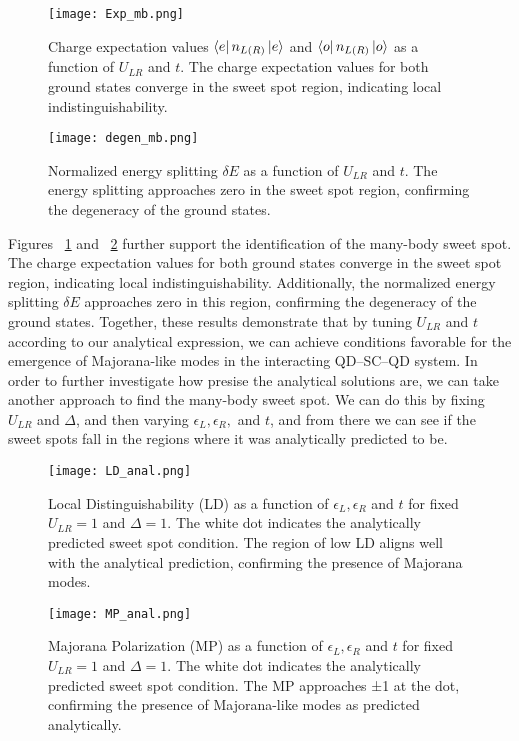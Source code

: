 \documentclass[11pt, letterpaper, titlepage]{article}
\begin{document}
\newpage 
\begin{figure}
  \centering
  \texttt{[image: Exp\_mb.png]}
  \caption{Charge expectation values $\bra{e}n_{L(R)}\ket{e}$ and $\bra{o}n_{L(R)}\ket{o}$ as a function of $U_{LR}$ and $t$. The charge expectation values for both ground states converge in the sweet spot region, indicating local indistinguishability.}
  \label{fig:mb_charge}
\end{figure}
\begin{figure}
  \centering
  \texttt{[image: degen\_mb.png]}
  \caption{Normalized energy splitting $\delta E$ as a function of $U_{LR}$ and $t$. The energy splitting approaches zero in the sweet spot region, confirming the degeneracy of the ground states.}
  \label{fig:mb_deltaE}
\end{figure}
Figures ~\ref{fig:mb_charge} and ~\ref{fig:mb_deltaE} further support the identification of the many-body sweet spot. The charge expectation values for both ground states converge in the sweet spot region, indicating local indistinguishability. Additionally, the normalized energy splitting $\delta E$ approaches zero in this region, confirming the degeneracy of the ground states. Together, these results demonstrate that by tuning $U_{LR}$ and $t$ according to our analytical expression, we can achieve conditions favorable for the emergence of Majorana-like modes in the interacting QD–SC–QD system.
\newpage
In order to further investigate how presise the analytical solutions are, we can take another approach to find the many-body sweet spot. We can do this by fixing $U_{LR}$ and $Δ$, and then varying $ϵ_L, ϵ_R,$ and $t$, and from there we can see if the sweet spots fall in the regions where it was analytically predicted to be.\\
\begin{figure}[htbp]
  \centering
  \texttt{[image: LD\_anal.png]}
  \caption{Local Distinguishability (LD) as a function of $ϵ_L,ϵ_R$ and $t$ for fixed $U_{LR} = 1$ and $Δ = 1$. The white dot indicates the analytically predicted sweet spot condition. The region of low LD aligns well with the analytical prediction, confirming the presence of Majorana modes.}
  \label{fig:mb_LD_anal}
\end{figure}
\begin{figure}[htbp]
  \centering
  \texttt{[image: MP\_anal.png]}
  \caption{Majorana Polarization (MP) as a function of $ϵ_L,ϵ_R$ and $t$ for fixed $U_{LR} = 1$ and $Δ = 1$. The white dot indicates the analytically predicted sweet spot condition. The MP approaches ±1 at the dot, confirming the presence of Majorana-like modes as predicted analytically.}
  \label{fig:mb_MP_anal}
\end{figure}
\end{document}
